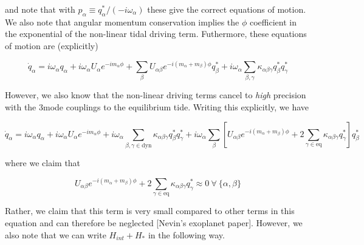 and note that with $p_\alpha \equiv q_\alpha^\ast/(-i\omega_\alpha)$ these give the correct equations of motion. We also note that angular momentum conservation implies the $\phi$ coefficient in the exponential of the non-linear tidal driving term. Futhermore, these equations of motion are (explicitly)

\begin{equation}
\dot{q}_\alpha = i\omega_\alpha q_\alpha + i\omega_\alpha U_\alpha e^{-im_\alpha \phi} + \sum_\beta U_{\alpha\beta}e^{-i(m_\alpha+m_\beta)\phi}q_\beta^\ast + i\omega_\alpha \sum_{\beta,\gamma} \kappa_{\alpha\beta\gamma} q_\beta^\ast q_\gamma^\ast
\end{equation}

However, we also know that the non-linear driving terms cancel to \emph{high} precision with the 3mode couplings to the equilibrium tide. Writing this explicitly, we have

\begin{equation}
\dot{q}_\alpha = i\omega_\alpha q_\alpha + i\omega_\alpha U_\alpha e^{-im_\alpha \phi} + i\omega_\alpha \sum_{\beta,\gamma\in\mathrm{dyn}} \kappa_{\alpha\beta\gamma} q_\beta^\ast q_\gamma^\ast + i\omega_\alpha \sum_\beta \left[ U_{\alpha\beta}e^{-i(m_\alpha+m_\beta)\phi} + 2 \sum_{\gamma\in\mathrm{eq}}  \kappa_{\alpha\beta\gamma} q_\gamma^\ast\right] q_\beta^\ast
\end{equation}

where we claim that

\begin{equation}\label{equation: Uab +klin cancellation}
U_{\alpha\beta}e^{-i(m_\alpha+m_\beta)\phi} + 2 \sum_{\gamma\in\mathrm{eq}}  \kappa_{\alpha\beta\gamma} q_\gamma^\ast \approx 0\ \forall\ \{\alpha,\beta\}
\end{equation}

Rather, we claim that this term is very small compared to other terms in this equation and can therefore be neglected [Nevin's exoplanet paper]. However, we also note that we can write $H_{int}+H_\ast$ in the following way.

